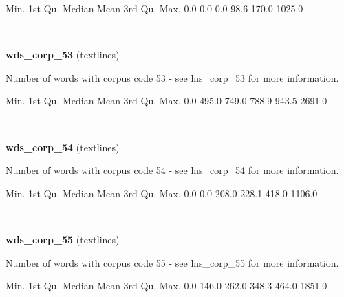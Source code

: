 \documentclass[]{article}
\newenvironment{Shaded}{\begin{snugshade}}{\end{snugshade}}
\newcommand{\FloatTok}[1]{\textcolor[rgb]{0.00,0.00,0.81}{{#1}}}
\newcommand{\NormalTok}[1]{{#1}}
\begin{document}
\begin{Shaded}
\begin{Highlighting}[]
   \NormalTok{Min. 1st Qu.  Median    Mean 3rd Qu.    Max. }
    \FloatTok{0.0}     \FloatTok{0.0}     \FloatTok{0.0}    \FloatTok{98.6}   \FloatTok{170.0}  \FloatTok{1025.0} 
\end{Highlighting}
\end{Shaded}

~

\vspace{1em}

\textbf{wds\_corp\_53} (textlines)

Number of words with corpus code 53 - see lns\_corp\_53 for more
information.

\begin{Shaded}
\begin{Highlighting}[]
   \NormalTok{Min. 1st Qu.  Median    Mean 3rd Qu.    Max. }
    \FloatTok{0.0}   \FloatTok{495.0}   \FloatTok{749.0}   \FloatTok{788.9}   \FloatTok{943.5}  \FloatTok{2691.0} 
\end{Highlighting}
\end{Shaded}

~

\vspace{1em}

\textbf{wds\_corp\_54} (textlines)

Number of words with corpus code 54 - see lns\_corp\_54 for more
information.

\begin{Shaded}
\begin{Highlighting}[]
   \NormalTok{Min. 1st Qu.  Median    Mean 3rd Qu.    Max. }
    \FloatTok{0.0}     \FloatTok{0.0}   \FloatTok{208.0}   \FloatTok{228.1}   \FloatTok{418.0}  \FloatTok{1106.0} 
\end{Highlighting}
\end{Shaded}

~

\vspace{1em}

\textbf{wds\_corp\_55} (textlines)

Number of words with corpus code 55 - see lns\_corp\_55 for more
information.

\begin{Shaded}
\begin{Highlighting}[]
   \NormalTok{Min. 1st Qu.  Median    Mean 3rd Qu.    Max. }
    \FloatTok{0.0}   \FloatTok{146.0}   \FloatTok{262.0}   \FloatTok{348.3}   \FloatTok{464.0}  \FloatTok{1851.0} 
\end{Highlighting}
\end{Shaded}
\end{document}
